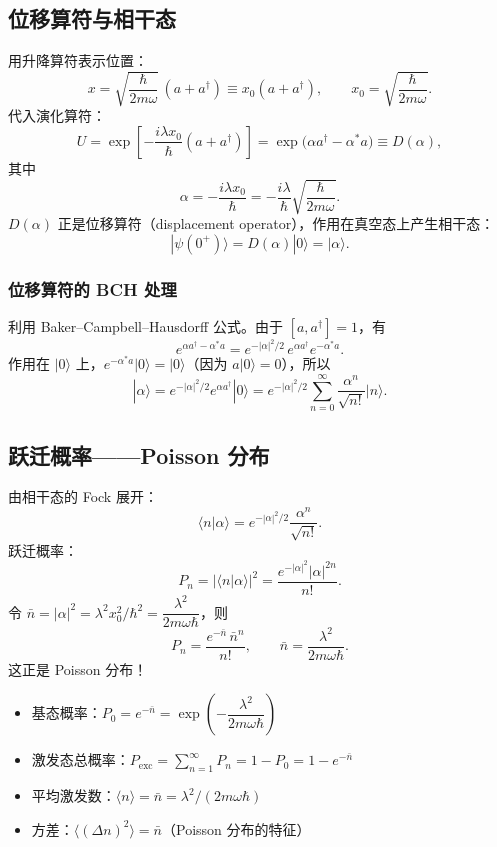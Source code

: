 \subsection{位移算符与相干态}

\begin{derivationbox}[位移算符与相干态]
用升降算符表示位置：
\[
x = \sqrt{\frac{\hbar}{2m\omega}} \, (a + a^\dagger) \equiv x_0 (a + a^\dagger), \qquad x_0 = \sqrt{\frac{\hbar}{2m\omega}}.
\]
代入演化算符：
\[
U = \exp\!\left[ -\frac{i\lambda x_0}{\hbar} (a + a^\dagger) \right] = \exp\!\bigl( \alpha a^\dagger - \alpha^* a \bigr) \equiv D(\alpha),
\]
其中
\[
\alpha = -\frac{i\lambda x_0}{\hbar} = -\frac{i\lambda}{\hbar} \sqrt{\frac{\hbar}{2m\omega}}.
\]
$D(\alpha)$ 正是位移算符（displacement operator），作用在真空态上产生相干态：
\[
|\psi(0^+)\rangle = D(\alpha) |0\rangle = |\alpha\rangle.
\]

\subsubsection{位移算符的 BCH 处理}

利用 Baker--Campbell--Hausdorff 公式。由于 $[a, a^\dagger] = 1$，有
\[
e^{\alpha a^\dagger - \alpha^* a} = e^{-|\alpha|^2/2} \, e^{\alpha a^\dagger} e^{-\alpha^* a}.
\]
作用在 $|0\rangle$ 上，$e^{-\alpha^* a}|0\rangle = |0\rangle$（因为 $a|0\rangle = 0$），所以
\[
|\alpha\rangle = e^{-|\alpha|^2/2} e^{\alpha a^\dagger} |0\rangle = e^{-|\alpha|^2/2} \sum_{n=0}^\infty \frac{\alpha^n}{\sqrt{n!}} |n\rangle.
\]
\end{derivationbox}

\subsection{跃迁概率——Poisson 分布}

\begin{formulabox}
由相干态的 Fock 展开：
\[
\langle n|\alpha\rangle = e^{-|\alpha|^2/2} \frac{\alpha^n}{\sqrt{n!}}.
\]
跃迁概率：
\[
P_n = |\langle n|\alpha\rangle|^2 = \frac{e^{-|\alpha|^2} |\alpha|^{2n}}{n!}.
\]
令 $\bar{n} = |\alpha|^2 = \lambda^2 x_0^2/\hbar^2 = \dfrac{\lambda^2}{2m\omega\hbar}$，则
\[
P_n = \frac{e^{-\bar{n}} \, \bar{n}^n}{n!}, \qquad \bar{n} = \frac{\lambda^2}{2m\omega\hbar}.
\]
这正是 Poisson 分布！
\begin{itemize}
\item 基态概率：$P_0 = e^{-\bar{n}} = \exp\!\left( -\dfrac{\lambda^2}{2m\omega\hbar} \right)$
\item 激发态总概率：$P_{\mathrm{exc}} = \sum_{n=1}^\infty P_n = 1 - P_0 = 1 - e^{-\bar{n}}$
\item 平均激发数：$\langle n\rangle = \bar{n} = \lambda^2/(2m\omega\hbar)$
\item 方差：$\langle (\Delta n)^2\rangle = \bar{n}$（Poisson 分布的特征）
\end{itemize}
\end{formulabox}

